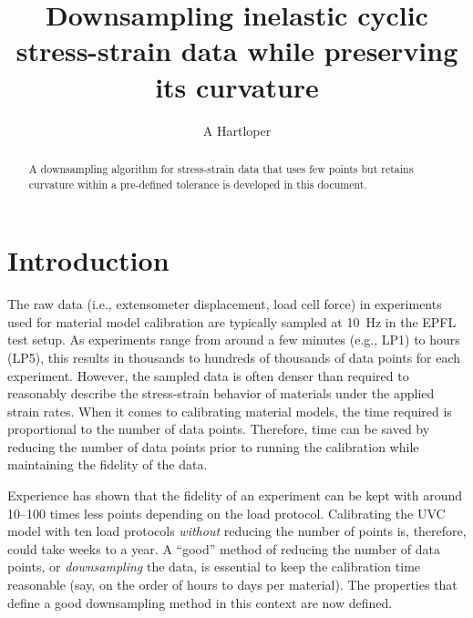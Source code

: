 \documentclass[a4paper,11pt]{article}
\title{Downsampling inelastic cyclic stress-strain data while preserving its curvature}
\author{A Hartloper}
\begin{document}
\maketitle

\begin{abstract}
    A downsampling algorithm for stress-strain data that uses few points but retains curvature within a pre-defined tolerance is developed in this document.
\end{abstract}

\section{Introduction}

The raw data (i.e., extensometer displacement, load cell force) in experiments used for material model calibration are typically sampled at 10~Hz in the EPFL test setup.
As experiments range from around a few minutes (e.g., LP1) to hours (LP5), this results in thousands to hundreds of thousands of data points for each experiment.
However, the sampled data is often denser than required to reasonably describe the stress-strain behavior of materials under the applied strain rates.
When it comes to calibrating material models, the time required is proportional to the number of data points.
Therefore, time can be saved by reducing the number of data points prior to running the calibration while maintaining the fidelity of the data.

Experience has shown that the fidelity of an experiment can be kept with around 10--100 times less points depending on the load protocol.
Calibrating the UVC model with ten load protocols \emph{without} reducing the number of points is, therefore, could take weeks to a year.
A ``good'' method of reducing the number of data points, or \emph{downsampling} the data, is essential to keep the calibration time reasonable (say, on the order of hours to days per material).
The properties that define a good downsampling method in this context are now defined.
\end{document}
